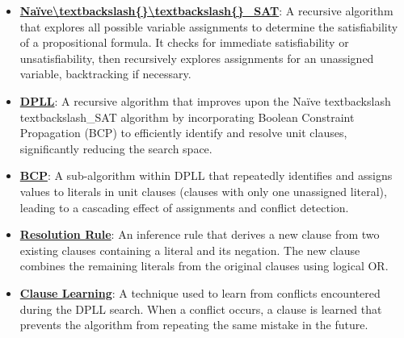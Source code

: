 \documentclass{article}%
\begin{document}
\begin{itemize}[leftmargin=*]%
\item \href{https://purdue.brightspace.com/d2l/common/assets/pdfjs-d2l-dist/1.0.14-legacy/web/viewer.html?file=\%2Fcontent\%2Fenforced\%2F1095467-wl.202510.CS.24300.001\%2F15L2-SAT.pdf\%3Fou\%3D1095467\&lang=en-us\&container=d2l-fileviewer-rendered-pdf\&fullscreen=d2l-fileviewer-rendered-pdf-dialog\&height=667#page=18}{\textbf{Naïve\textbackslash{}textbackslash\{\}\textbackslash{}textbackslash\{\}\_SAT}}: A recursive algorithm that explores all possible variable assignments to determine the satisfiability of a propositional formula. It checks for immediate satisfiability or unsatisfiability, then recursively explores assignments for an unassigned variable, backtracking if necessary.%
\item \href{https://purdue.brightspace.com/d2l/common/assets/pdfjs-d2l-dist/1.0.14-legacy/web/viewer.html?file=\%2Fcontent\%2Fenforced\%2F1095467-wl.202510.CS.24300.001\%2F15L2-SAT.pdf\%3Fou\%3D1095467\&lang=en-us\&container=d2l-fileviewer-rendered-pdf\&fullscreen=d2l-fileviewer-rendered-pdf-dialog\&height=667#page=17}{\textbf{DPLL}}: A recursive algorithm that improves upon the Naïve textbackslash{} textbackslash{}_SAT algorithm by incorporating Boolean Constraint Propagation (BCP) to efficiently identify and resolve unit clauses, significantly reducing the search space.%
\item \href{https://purdue.brightspace.com/d2l/common/assets/pdfjs-d2l-dist/1.0.14-legacy/web/viewer.html?file=\%2Fcontent\%2Fenforced\%2F1095467-wl.202510.CS.24300.001\%2F15L2-SAT.pdf\%3Fou\%3D1095467\&lang=en-us\&container=d2l-fileviewer-rendered-pdf\&fullscreen=d2l-fileviewer-rendered-pdf-dialog\&height=667#page=20}{\textbf{BCP}}: A sub-algorithm within DPLL that repeatedly identifies and assigns values to literals in unit clauses (clauses with only one unassigned literal), leading to a cascading effect of assignments and conflict detection.%
\item \href{https://purdue.brightspace.com/d2l/common/assets/pdfjs-d2l-dist/1.0.14-legacy/web/viewer.html?file=\%2Fcontent\%2Fenforced\%2F1095467-wl.202510.CS.24300.001\%2F15L2-SAT.pdf\%3Fou\%3D1095467\&lang=en-us\&container=d2l-fileviewer-rendered-pdf\&fullscreen=d2l-fileviewer-rendered-pdf-dialog\&height=667#page=32}{\textbf{Resolution Rule}}: An inference rule that derives a new clause from two existing clauses containing a literal and its negation. The new clause combines the remaining literals from the original clauses using logical OR.%
\item \href{https://purdue.brightspace.com/d2l/common/assets/pdfjs-d2l-dist/1.0.14-legacy/web/viewer.html?file=\%2Fcontent\%2Fenforced\%2F1095467-wl.202510.CS.24300.001\%2F15L2-SAT.pdf\%3Fou\%3D1095467\&lang=en-us\&container=d2l-fileviewer-rendered-pdf\&fullscreen=d2l-fileviewer-rendered-pdf-dialog\&height=667#page=35}{\textbf{Clause Learning}}: A technique used to learn from conflicts encountered during the DPLL search. When a conflict occurs, a clause is learned that prevents the algorithm from repeating the same mistake in the future.%
\end{itemize}%
\end{document}
